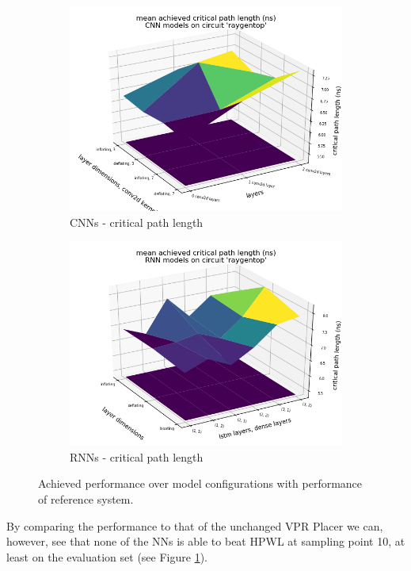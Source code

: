 \begin{figure}
\begin{subfigure}[b]{0.49\linewidth}
		\includegraphics[width=\linewidth]{plots/cnn-hyperopt-critical-path-with-reference.png}
		\caption{\glspl{CNN} - critical path length}
	\end{subfigure}
	\begin{subfigure}[b]{0.49\linewidth}
		\includegraphics[width=\linewidth]{plots/rnn-hyperopt-critical-path-with-reference.png}
		\caption{\glspl{RNN} - critical path length}
	\end{subfigure}
	\caption{Achieved performance over model configurations with performance of reference system.}
	\label{fig:eval-hyperopt-surface-reference}
\end{figure}

By comparing the performance to that of the unchanged \gls{VPR} Placer we can, however, see that none of the \glspl{NN} is able to beat \gls{HPWL} at sampling point 10, at least on the evaluation set (see Figure \ref{fig:eval-hyperopt-surface-reference}).

